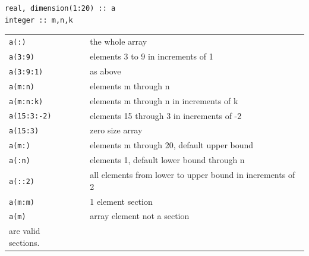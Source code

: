 \documentclass[c,mathserif,compress,xcolor=svgnames]{beamer}
\newcommand{\lstfortran}[1]{\lstinline[language={[90]Fortran},basicstyle=\footnotesize\ttfamily]|#1|}
\begin{document}
\begin{frame}
  \begin{lstlisting}[language={[90]Fortran}]
real, dimension(1:20) :: a
integer :: m,n,k
  \end{lstlisting}
  \begin{center}
    \scriptsize
    \begin{tabular}{lcl}
      {\lstfortran{a(:)}} &  & the whole array \\
      {\lstfortran{a(3:9)}} &  & elements 3 to 9 in increments of 1 \\
      {\lstfortran{a(3:9:1)}} &  & as above \\
      {\lstfortran{a(m:n)}} &  & elements m through n\\
      {\lstfortran{a(m:n:k)}} &  & elements m through n in increments of k \\
      {\lstfortran{a(15:3:-2)}} &  & elements 15 through 3 in increments of -2 \\
      {\lstfortran{a(15:3)}} &  & zero size array \\
      {\lstfortran{a(m:)}} &  & elements m through 20, default upper bound \\
      {\lstfortran{a(:n)}} &  & elements 1, default lower bound through n \\
      {\lstfortran{a(::2)}} &  & all elements from lower to upper bound in increments of 2 \\
      {\lstfortran{a(m:m)}} &  & 1 element section \\
      {\lstfortran{a(m)}} &  & array element not a section \\
      are valid sections. & & \\
    \end{tabular}
  \end{center}
\end{frame}
\end{document}
